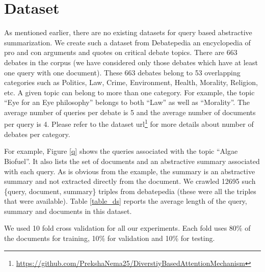 \documentclass[11pt]{article}
\begin{document}
\section{Dataset}
As mentioned earlier, there are no existing datasets for query based abstractive summarization. We create such a dataset from Debatepedia an encyclopedia of pro and con arguments and quotes on critical debate topics. There are 663 debates in the corpus (we have considered only those debates which have at least one query with one document). These 663 debates belong to 53 overlapping categories such as Politics, Law, Crime, Environment, Health, Morality, Religion, etc. A given topic can belong to more than one category. For example, the topic ``Eye for an Eye philosophy'' belongs to both ``Law'' as well as ``Morality''. The average number of queries per debate is 5 and the average number of documents per query is 4. Please refer to the dataset url\footnote{\url{https://github.com/PrekshaNema25/DiverstiyBasedAttentionMechanism}} for more details about number of debates per category.


For example, Figure \ref{q} shows the queries associated with the topic ``Algae Biofuel''. It also lists the set of documents and an abstractive summary associated with each query. As is obvious from the example, the summary is an abstractive summary and not extracted directly from the document. We crawled 12695 such \{query, document, summary\} triples from debatepedia (these were all the triples that were available). Table \ref{table_ds} reports the average length of the query, summary and documents in this dataset. 

We used 10 fold cross validation for all our experiments. Each fold uses 80\% of the documents for training, 10\% for validation and 10\% for testing.
\end{document}
